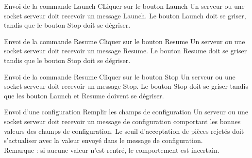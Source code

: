 {Envoi de la commande Launch}
	{CLiquer sur le bouton Launch}
	{Un serveur ou une socket serveur doit recevoir un message Launch.
    Le bouton Launch doit se griser, tandis que le bouton Stop doit se dégriser.}

{Envoi de la commande Resume}
	{Cliquer sur le bouton Resume}
	{Un serveur ou une socket serveur doit recevoir un message Resume.
    Le bouton Resume doit se griser tandis que le bouton Stop doit se dégriser.}

{Envoi de la commande Resume}
	{Cliquer sur le bouton Stop}
	{Un serveur ou une socket serveur doit recevoir un message Stop.
    Le bouton Stop doit se griser tandis que les bouton Launch et Resume doivent se dégriser.}

{Envoi d'une configuration}
	{Remplir les champs de configuration}
	{Un serveur ou une socket serveur doit recevoir un message de configuration comportant les bonnes valeurs des champs de configuration.
    Le seuil d'acceptation de pièces rejetés doit s'actualiser avec la valeur envoyé dans le message de configuration.    
    \\Remarque : si aucune valeur n'est rentré, le comportement est incertain.}

    

